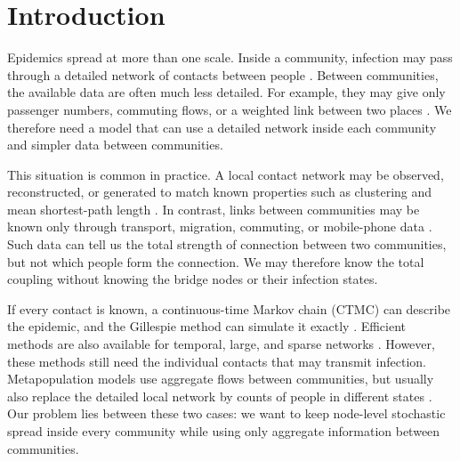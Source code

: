 \documentclass[a4paper,fleqn]{cas-sc}
\begin{document}
\maketitle

\section{Introduction}
\label{sec:introduction}

Epidemics spread at more than one scale. Inside a community, infection may pass through a detailed network of contacts between people \citep{keeling2005,pastorsatorras2015,kiss2017}. Between communities, the available data are often much less detailed. For example, they may give only passenger numbers, commuting flows, or a weighted link between two places \citep{balcan2009,barbosa2018human}. We therefore need a model that can use a detailed network inside each community and simpler data between communities.

This situation is common in practice. A local contact network may be observed, reconstructed, or generated to match known properties such as clustering and mean shortest-path length \citep{eubank2004,danon2011}. In contrast, links between communities may be known only through transport, migration, commuting, or mobile-phone data \citep{barbosa2018human,chang2021}. Such data can tell us the total strength of connection between two communities, but not which people form the connection. We may therefore know the total coupling without knowing the bridge nodes or their infection states.

If every contact is known, a continuous-time Markov chain (CTMC) can describe the epidemic, and the Gillespie method can simulate it exactly \citep{gillespie1977exact,gibson2000}. Efficient methods are also available for temporal, large, and sparse networks \citep{vestergaard2015,kuryliak2025simulating}. However, these methods still need the individual contacts that may transmit infection. Metapopulation models use aggregate flows between communities, but usually also replace the detailed local network by counts of people in different states \citep{colizza2007reaction,colizza2008,balcan2010modeling,ajelli2010}. Our problem lies between these two cases: we want to keep node-level stochastic spread inside every community while using only aggregate information between communities.
\end{document}
